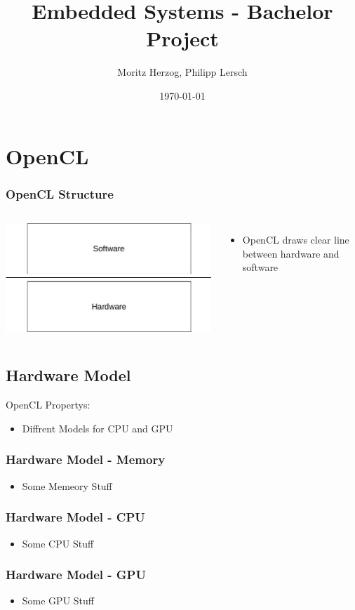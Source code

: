 \documentclass{beamer}
\title{Embedded Systems - Bachelor Project}
\author{Moritz Herzog, Philipp Lersch}
\date{\today}
\begin{document}
\maketitle


\section{OpenCL}
\begin{frame}
    \frametitle{OpenCL Structure}
    \begin{columns}
        \includegraphics[width=\textwidth]{res/HardwareSoftwareLayer.jpg}
        \begin{itemize}
            \item OpenCL draws clear line between hardware and software
        \end{itemize}
    \end{columns}
\end{frame}
\subsection{Hardware Model}
\begin{frame}
    OpenCL Propertys:
    \begin{itemize}
     \item Diffrent Models for CPU and GPU
    \end{itemize}
\end{frame}
\begin{frame}
    \frametitle{Hardware Model - Memory}
    \begin{itemize}
     \item Some Memeory Stuff
    \end{itemize}
\end{frame}
\begin{frame}
    \frametitle{Hardware Model - CPU}
    \begin{itemize}
     \item Some CPU Stuff
    \end{itemize}
\end{frame}
\begin{frame}
    \frametitle{Hardware Model - GPU}
    \begin{itemize}
     \item Some GPU Stuff
    \end{itemize}
\end{frame}
\end{document}
